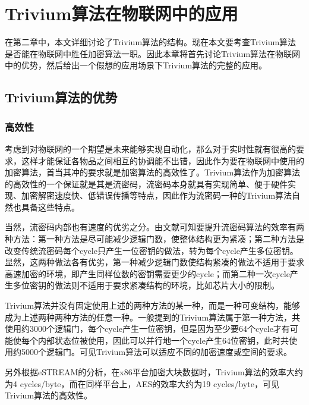 
\chapter{Trivium算法在物联网中的应用}
\label{chap:use}

在第二章中，本文详细讨论了Trivium算法的结构。现在本文要考查Trivium算法是否能在物联网中胜任加密算法一职。因此本章将首先讨论Trivium算法在物联网中的优势，然后给出一个假想的应用场景下Trivium算法的完整的应用。

\section{Trivium算法的优势}
\label{sec:advantage}

\subsection{高效性}

考虑到对物联网的一个期望是未来能够实现自动化，那么对于实时性就有很高的要求，这样才能保证各物品之间相互的协调能不出错，因此作为要在物联网中使用的加密算法，首当其冲的要求就是加密算法的高效性了。Trivium算法作为加密算法的高效性的一个保证就是其是流密码，流密码本身就具有实现简单、便于硬件实现、加密解密速度快、低错误传播等特点，因此作为流密码一种的Trivium算法自然也具备这些特点。

当然，流密码内部也有速度的优劣之分。由文献\supercite{de2006trivium}可知要提升流密码算法的效率有两种方法：第一种方法是尽可能减少逻辑门数，使整体结构更为紧凑；第二种方法是改变传统流密码每个cycle只产生一位密钥的做法，转为每个cycle产生多位密钥。显然，这两种做法各有优劣，第一种减少逻辑门数使结构紧凑的做法不适用于要求高速加密的环境，即产生同样位数的密钥需要更少的cycle；而第二种一次cycle产生多位密钥的做法则不适用于要求紧凑结构的环境，比如芯片大小的限制。

Trivium算法并没有固定使用上述的两种方法的某一种，而是一种可变结构，能够成为上述两种两种方法的任意一种。一般提到的Trivium算法属于第一种方法，共使用约3000个逻辑门，每个cycle产生一位密钥\supercite{good2008hardware}，但是因为至少要64个cycle才有可能使每个内部状态位被使用，因此可以并行地一个cycle产生64位密钥，此时共使用约5000个逻辑门。可见Trivium算法可以适应不同的加密速度或空间的要求。

另外根据eSTREAM的分析，在x86平台加密大块数据时，Trivium算法的效率大约为4 cycles/byte，而在同样平台上，AES的效率大约为19 cycles/byte，可见Trivium算法的高效性。

